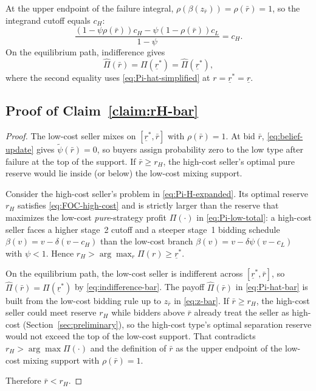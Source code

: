 At the upper endpoint of the failure integral,
$\rho(\beta(z_{\bar{r}}))=\rho(\bar{r})=1$, so the integrand cutoff equals
$c_H$:
\begin{equation*}
  \frac{
    (1 - \psi \rho(\bar{r})) c_H
    - \psi(1 - \rho(\bar{r})) c_L
  }{1 - \psi}
  = c_H.
\end{equation*}
On the equilibrium path, indifference gives
\begin{equation}
  \hat{\Pi}(\bar{r}) = \Pi(\underline{r}^{*})
  = \hat{\Pi}(\underline{r}^{*}),
  \label{eq:indifference-bar}
\end{equation}
where the second equality uses \eqref{eq:Pi-hat-simplified} at
$r=\underline{r}^{*}=\underline{r}$.

\subsection{Proof of Claim~\ref{claim:rH-bar}}
\label{subsec:proof-rH-bar}

\begin{proof}
The low-cost seller mixes on $[\underline{r}^{*},\bar{r}]$ with
$\rho(\bar{r})=1$.
At bid $\bar{r}$, \eqref{eq:belief-update} gives $\tilde{\psi}(\bar{r})=0$, so
buyers assign probability zero to the low type after failure at the top of the
support.
If $\bar{r}\ge r_H$, the high-cost seller's optimal pure reserve would lie
inside (or below) the low-cost mixing support.

Consider the high-cost seller's problem in \eqref{eq:Pi-H-expanded}.
Its optimal reserve $r_H$ satisfies \eqref{eq:FOC-high-cost} and is strictly
larger than the reserve that maximizes the low-cost \emph{pure}-strategy profit
$\Pi(\cdot)$ in \eqref{eq:Pi-low-total}:
a high-cost seller faces a higher stage~2 cutoff and a steeper stage~1 bidding
schedule $\beta(v)=v-\delta(v-c_H)$ than the low-cost branch
$\beta(v)=v-\delta\psi(v-c_L)$ with $\psi<1$.
Hence $r_H>\arg\max_{r}\Pi(r)\ge \underline{r}^{*}$.

On the equilibrium path, the low-cost seller is indifferent across
$[\underline{r}^{*},\bar{r}]$, so
$\hat{\Pi}(\bar{r})=\Pi(\underline{r}^{*})$ by \eqref{eq:indifference-bar}.
The payoff $\hat{\Pi}(\bar{r})$ in \eqref{eq:Pi-hat-bar} is built from the
low-cost bidding rule up to $z_{\bar{r}}$ in \eqref{eq:z-bar}.
If $\bar{r}\ge r_H$, the high-cost seller could meet reserve $r_H$ while
bidders above $\bar{r}$ already treat the seller as high-cost
(Section~\ref{sec:preliminary}), so the high-cost type's optimal separation
reserve would not exceed the top of the low-cost support.
That contradicts $r_H>\arg\max\Pi(\cdot)$ and the definition of $\bar{r}$ as
the upper endpoint of the low-cost mixing support with $\rho(\bar{r})=1$.

Therefore $\bar{r}<r_H$.
\end{proof}
